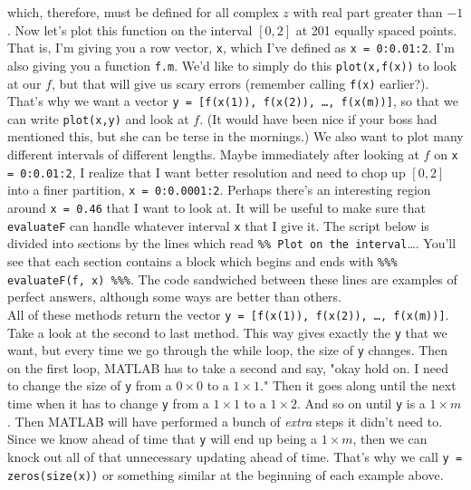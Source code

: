 \documentclass{article}
\begin{document}
{\setlength{\parindent}{0cm}
which, therefore, must be defined for all complex $z$ with real part greater than $-1$. Now let's plot this function on the interval $[0, 2]$ at 201 equally spaced points. That is, I'm giving you a row vector, \texttt{x}, which I've defined as \texttt{x = 0:0.01:2}. I'm also giving you a function \texttt{f.m}. We'd like to simply do this \texttt{plot(x,f(x))} to look at our $f$, but that will give us scary errors (remember calling \texttt{f(x)} earlier?). That's why we want a vector \texttt{y = [f(x(1)), f(x(2)), \dots, f(x(m))]}, so that we can write \texttt{plot(x,y)} and look at $f$. (It would have been nice if your boss had mentioned this, but she can be terse in the mornings.) We also want to plot many different intervals of different lengths. Maybe immediately after looking at $f$ on \texttt{x = 0:0.01:2}, I realize that I want better resolution and need to chop up $[0, 2]$ into a finer partition, \texttt{x = 0:0.0001:2}. Perhaps there's an interesting region around \texttt{x = 0.46} that I want to look at. It will be useful to make sure that \texttt{evaluateF} can handle whatever interval \texttt{x} that I give it. The script below is divided into sections by the lines which read \texttt{\%\% Plot on the interval}\dots . You'll see that each section contains a block which begins and ends with \texttt{\%\%\% evaluateF(f, x) \%\%\%}. The code sandwiched between these lines are examples of perfect answers, although some ways are better than others. }\\



All of these methods return the vector \texttt{y = [f(x(1)), f(x(2)), \dots, f(x(m))]}. Take a look at the second to last method. This way gives exactly the \texttt{y} that we want, but every time we go through the while loop, the size of \texttt{y} changes. Then on the first loop, MATLAB has to take a second and say, "okay hold on. I need to change the size of \texttt{y} from a $0 \times 0$ to a $1 \times 1$." Then it goes along until the next time when it has to change \texttt{y} from a $1 \times 1$ to a $1 \times 2$. And so on until \texttt{y} is a $1 \times m$. Then MATLAB will have performed a bunch of \textit{extra} steps it didn't need to. Since we know ahead of time that \texttt{y} will end up being a $1 \times m$, then we can knock out all of that unnecessary updating ahead of time. That's why we call \texttt{y = zeros(size(x))} or something similar at the beginning of each example above.\\
\end{document}

